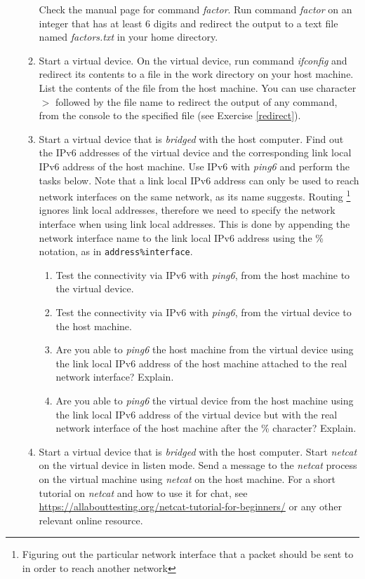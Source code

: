 \documentclass[12pt]{book}
\begin{document}
\begin{enumerate}[label=\arabic*.]
\begin{enumerate}
Check the manual page for command \emph{factor}. Run command \emph{factor} on an integer that has at least 6 digits and redirect the output to a text file named \emph{factors.txt} in your home directory. 

\item Start a virtual device. On the virtual device, run command \emph{ifconfig} and redirect its contents to a file in the work directory on your host machine. List the contents of the file from the host machine. You can use character $>$ followed by the file name to redirect the output of any command, from the console to the specified file (see Exercise \ref{redirect}).

\item Start a virtual device that is \emph{bridged} with the host computer. Find out the IPv6 addresses of the virtual device and the corresponding link local IPv6 address of the host machine. Use IPv6 with \emph{ping6} and perform the tasks below. Note that a link local IPv6 address can only be used to reach network interfaces on the same network, as its name suggests. Routing \footnote{Figuring out the particular network interface that a packet should be sent to in order to reach another network} ignores link local addresses, therefore we need to specify the network interface when using link local addresses. This is done by appending the network interface name to the link local IPv6 address using the \% notation, as in \lstinline$address%interface$. 
\begin{enumerate}[label=(\alph*)]
\item Test the connectivity via IPv6 with \emph{ping6}, from the host machine to the virtual device.
\item Test the connectivity via IPv6 with \emph{ping6}, from the virtual device to the host machine.
\item Are you able to \emph{ping6} the host machine from the virtual device using the link local IPv6 address of the host machine attached to the real network interface? Explain.
\item Are you able to \emph{ping6} the virtual device from the host machine using the link local IPv6 address of the virtual device but with the real network interface of the host machine after the \% character? Explain.
\end{enumerate}

\item Start a virtual device that is \emph{bridged} with the host computer. Start \emph{netcat} on the virtual device in listen mode. Send a message to the \emph{netcat} process on the virtual machine using \emph{netcat} on the host machine. For a short tutorial on \emph{netcat} and how to use it for chat, see \url{https://allabouttesting.org/netcat-tutorial-for-beginners/} or any other relevant online resource.
\end{enumerate}



\end{enumerate}
\end{document}
